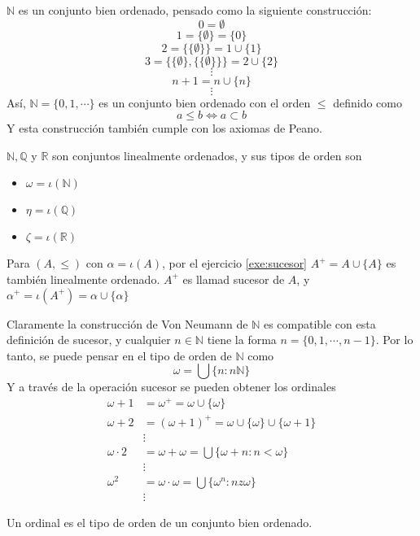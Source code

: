 \begin{example}
$\mathbb{N}$ es un conjunto bien ordenado, pensado como la siguiente construcción:
$$0=\emptyset$$
$$1=\{\emptyset\}=\{0\}$$
$$2=\{\{\emptyset\}\}=1\cup\{1\}$$
$$3=\{\{\emptyset\},\{\{\emptyset\}\}\}=2\cup\{2\}$$
$$\vdots$$
$$n+1=n\cup \{n\}$$
$$\vdots$$
Así, $\mathbb{N}=\{0,1,\cdots\}$ es un conjunto bien ordenado con el orden $\leq$ definido como 
$$a\leq b \iff a\subset b$$
Y esta construcción también cumple con los axiomas de Peano.
\end{example}
\begin{example}
$\mathbb{N},\mathbb{Q}$ y $\mathbb{R}$ son conjuntos linealmente ordenados, y sus tipos de orden son 
\begin{itemize}
    \item $\omega=\iota(\mathbb{N})$
    \item $\eta=\iota(\mathbb{Q})$
    \item $\zeta=\iota(\mathbb{R})$
\end{itemize}
\end{example}
\begin{definition}[Sucesor]
  Para $(A,\leq)$ con $\alpha=\iota(A)$, por el ejercicio \ref{exe:sucesor} $A^+=A\cup\{A\}$ es también linealmente ordenado. $A^+$ es llamad sucesor de $A$, y $\alpha^+=\iota(A^+)=\alpha\cup\{\alpha\}$
\end{definition}
Claramente la construcción de Von Neumann de $\mathbb{N}$ es compatible con esta definición de sucesor, y cualquier $n\in\mathbb{N}$ tiene la forma $n=\{0,1,\cdots,n-1\}$. Por lo tanto, se puede pensar en el tipo de orden de $\mathbb{N}$ como 
$$\omega=\bigcup\{n:n\mathbb{N}\}$$
Y a través de la operación sucesor se pueden obtener los ordinales
\begin{align*}
    \omega+1&=\omega^+=\omega\cup\{\omega\}\\
    \omega+2&=(\omega+1)^+=\omega\cup\{\omega\}\cup\{\omega+1\}\\
    &\vdots\\
    \omega\cdot2&=\omega+\omega=\bigcup\{\omega+n : n<\omega\}\\
    &\vdots\\
    \omega^2&=\omega\cdot\omega=\bigcup\{\omega^n:nz\omega\}\\
    &\vdots
\end{align*}
\begin{definition}[Ordinal]
  Un ordinal es el tipo de orden de un conjunto bien ordenado.
\end{definition}
